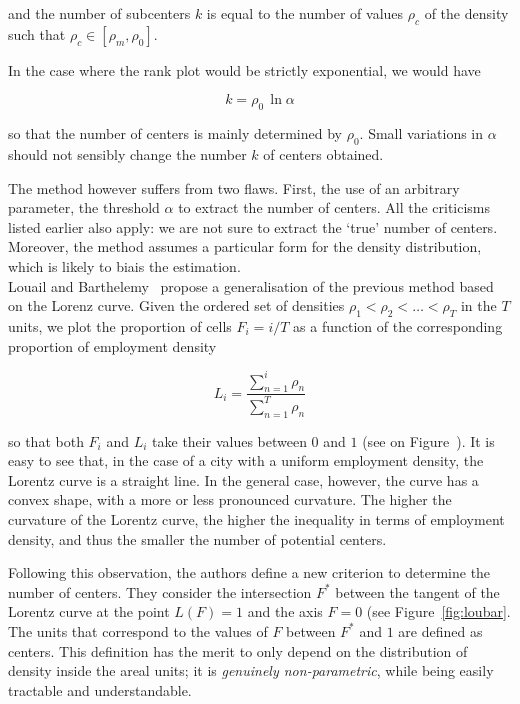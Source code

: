 and the number of subcenters $k$ is equal to the number of values $\rho_c$ of
the density such that $\rho_c \in \left[ \rho_m, \rho_0 \right]$. 

In the case where the rank plot would be strictly exponential, we would have

\begin{equation}
    k = \rho_0\,\ln \alpha
\end{equation}

so that the number of centers is mainly determined by $\rho_0$. Small variations
in $\alpha$ should not sensibly change the number $k$ of centers obtained.

The method however suffers from two flaws. First, the use of an arbitrary
parameter, the threshold $\alpha$ to extract the number of centers. All the criticisms listed earlier also apply: we are not sure to extract the
`true' number of centers. Moreover, the method assumes a particular form for
the density distribution, which is likely to biais the estimation.\\

Louail and Barthelemy~\cite{Louail:2014} propose a
generalisation of the previous method based on the Lorenz curve.  Given the ordered set of
densities $\rho_1 < \rho_2 < \dots < \rho_T$ in the $T$ units, we plot the
proportion of cells $F_i=i/T$ as a function of the corresponding proportion of
employment density

\begin{equation}
    L_i = \frac{\sum_{n=1}^i \rho_n}{\sum_{n=1}^T \rho_n}
\end{equation}

so that both $F_i$ and $L_i$ take their values between $0$ and $1$ (see on
Figure~\cite{fig:loubar}). It is easy
to see that, in the case of a city with a uniform employment density, the
Lorentz curve is a straight line. In the general case, however, the curve has a
convex shape, with a more or less pronounced curvature.  The higher the
curvature of the Lorentz curve, the higher the inequality in terms of employment
density, and thus the smaller the number of potential centers. 

Following this observation, the authors define a new criterion to determine the number of
centers. They consider the intersection $F^*$ between the tangent of the
Lorentz curve at the point $L(F) = 1$ and the axis $F=0$ (see
Figure~\ref{fig:loubar}. The units that correspond to the values of $F$ between
$F^*$ and $1$ are defined as centers. This definition has the merit to only
depend on the distribution of density inside the areal units; it is \emph{genuinely
non-parametric}, while being easily tractable and understandable.\\

